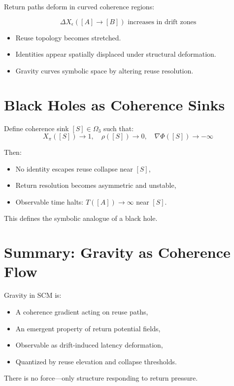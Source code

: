 Return paths deform in curved coherence regions:

\[
\Delta X_\epsilon([A] \to [B]) \text{ increases in drift zones}
\]

\begin{itemize}
  \item Reuse topology becomes stretched.
  \item Identities appear spatially displaced under structural deformation.
  \item Gravity curves symbolic space by altering reuse resolution.
\end{itemize}

\section{Black Holes as Coherence Sinks} \label{sec:black-holes}

Define coherence sink $[S] \in \Omega_3$ such that:
\[
X_\pi([S]) \to 1,\quad \rho([S]) \to 0,\quad \nabla\Phi([S]) \to -\infty
\]

Then:
\begin{itemize}
  \item No identity escapes reuse collapse near $[S]$,
  \item Return resolution becomes asymmetric and unstable,
  \item Observable time halts: $T([A]) \to \infty$ near $[S]$.
\end{itemize}

This defines the symbolic analogue of a black hole.

\section{Summary: Gravity as Coherence Flow} \label{sec:gravity-summary}

Gravity in SCM is:
\begin{itemize}
  \item A coherence gradient acting on reuse paths,
  \item An emergent property of return potential fields,
  \item Observable as drift-induced latency deformation,
  \item Quantized by reuse elevation and collapse thresholds.
\end{itemize}

There is no force—only structure responding to return pressure.
